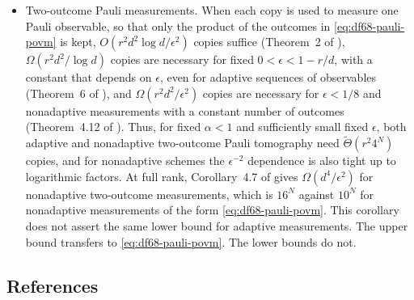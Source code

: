 \begin{itemize}
  \item Two-outcome Pauli measurements. When each copy is used to measure one Pauli observable, so that only the product of the outcomes in \eqref{eq:df68-pauli-povm} is kept, $O(r^2d^2\log d/\epsilon^2)$ copies suffice (Theorem~2 of ), $\Omega(r^2d^2/\log d)$ copies are necessary for fixed $0<\epsilon<1-r/d$, with a constant that depends on $\epsilon$, even for adaptive sequences of observables (Theorem~6 of ), and $\Omega(r^2d^2/\epsilon^2)$ copies are necessary for $\epsilon<1/8$ and nonadaptive measurements with a constant number of outcomes (Theorem~4.12 of ). Thus, for fixed $\alpha<1$ and sufficiently small fixed $\epsilon$, both adaptive and nonadaptive two-outcome Pauli tomography need $\tilde\Theta(r^2 4^N)$ copies, and for nonadaptive schemes the $\epsilon^{-2}$ dependence is also tight up to logarithmic factors. At full rank, Corollary~4.7 of  gives $\Omega(d^4/\epsilon^2)$ for nonadaptive two-outcome measurements, which is $16^N$ against $10^N$ for nonadaptive measurements of the form \eqref{eq:df68-pauli-povm}. This corollary does not assert the same lower bound for adaptive measurements. The upper bound transfers to \eqref{eq:df68-pauli-povm}. The lower bounds do not.
\end{itemize}

\subsection*{References}

